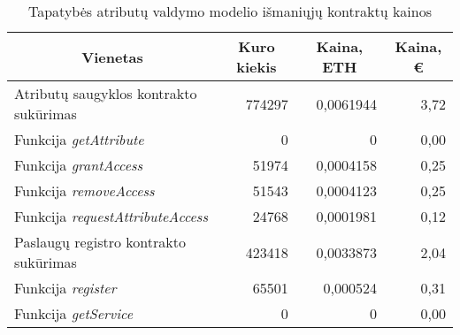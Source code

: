 
\begin{table}[H]
    \centering
    \caption{Tapatybės atributų valdymo modelio išmaniųjų kontraktų kainos}
      \begin{tabular}{|l|r|r|r|}
      \hline
      \multicolumn{1}{|c|}{\textbf{Vienetas}} & \multicolumn{1}{c|}{\textbf{Kuro kiekis}} & \multicolumn{1}{c|}{\textbf{Kaina, ETH}} & \multicolumn{1}{c|}{\textbf{Kaina, €}} \bigstrut\\
      \hline
      \multicolumn{1}{|p{16.5em}|}{Atributų saugyklos kontrakto sukūrimas} & 774297 & 0,0061944 & 3,72 \bigstrut[t]\\
      Funkcija \textit{getAttribute} & 0 & 0 & 0,00 \\
      Funkcija \textit{grantAccess} & 51974 & 0,0004158 & 0,25 \\
      Funkcija \textit{removeAccess} & 51543 & 0,0004123 & 0,25 \\
      Funkcija \textit{requestAttributeAccess} & 24768 & 0,0001981 & 0,12 \bigstrut[b]\\
      \hline
      \multicolumn{1}{|p{16.5em}|}{Paslaugų registro kontrakto sukūrimas} & 423418 & 0,0033873 & 2,04 \bigstrut[t]\\
      Funkcija \textit{register} & 65501 & 0,000524 & 0,31 \\
      Funkcija \textit{getService} & 0 & 0 & 0,00 \bigstrut[b]\\
      \hline
      \end{tabular}%
    \label{tab:contractPrices}%
  \end{table}%
  
  
  
  
  